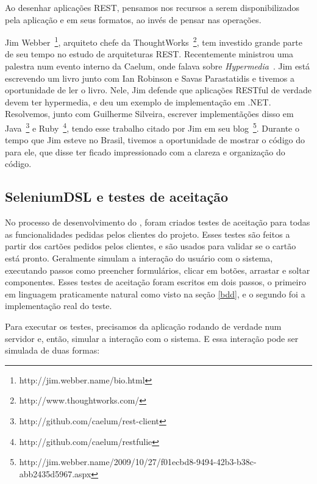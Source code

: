 Ao desenhar aplicações REST, pensamos nos recursos a serem disponibilizados pela aplicação e em seus formatos, ao invés de pensar nas operações.

Jim Webber~\footnote{http://jim.webber.name/bio.html}, arquiteto chefe da ThoughtWorks~\footnote{http://www.thoughtworks.com/}, tem investido grande parte de seu tempo no estudo de arquiteturas REST. Recentemente ministrou uma palestra num evento interno da Caelum, onde falava sobre \textit{Hypermedia}~\cite{rest-jim}. Jim está escrevendo um livro junto com Ian Robinson e Savas Parastatidis e tivemos a oportunidade de ler o livro. Nele, Jim defende que aplicações RESTful de verdade devem ter hypermedia, e deu um exemplo de implementação em .NET. Resolvemos, junto com Guilherme Silveira, escrever implementãções disso em Java~\footnote{http://github.com/caelum/rest-client} e Ruby~\footnote{http://github.com/caelum/restfulie}, tendo esse trabalho citado por Jim em seu blog~\footnote{http://jim.webber.name/2009/10/27/f01ecbd8-9494-42b3-b38c-abb2435d5967.aspx}. Durante o tempo que Jim esteve no Brasil, tivemos a oportunidade de mostrar o código do \calopsita para ele, que disse ter ficado impressionado com a clareza e organização do código.

\subsection{SeleniumDSL e testes de aceitação}
No processo de desenvolvimento do \calopsita, foram criados testes de aceitação para todas as
funcionalidades pedidas pelos clientes do projeto. Esses testes são feitos a partir dos cartões pedidos pelos clientes,
e são usados para validar se o cartão está pronto. Geralmente simulam a interação do usuário com o sistema, executando
passos como preencher formulários, clicar em botões, arrastar e soltar componentes. Esses testes de aceitação
foram escritos em dois passos, o primeiro em linguagem praticamente natural como visto na seção \ref{bdd}, e o segundo
foi a implementação real do teste.

Para executar os testes, precisamos da aplicação rodando de verdade num servidor e, então, simular a interação com o sistema. E essa interação pode ser simulada de duas formas:

